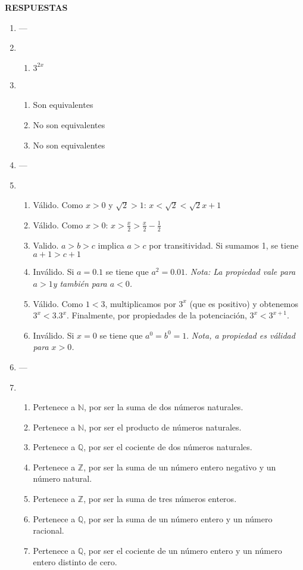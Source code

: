 \documentclass[a4paper]{article}
\newcommand{\exercise}{\item}
\begin{document}
\vspace{20pt} 
 \textbf{RESPUESTAS}\begin{enumerate}\exercise---\exercise\begin{enumerate} [label=(\alph*)]		\item $3^{2x}$
\end{enumerate}\exercise\begin{enumerate} [label=(\alph*)]		\item Son equivalentes
		\item No son equivalentes
		\item No son equivalentes
\end{enumerate}\exercise---\exercise\begin{enumerate} [label=(\alph*)]		\item Válido. Como $x>0$ y $\sqrt{2}>1$: $x < \sqrt{2} < \sqrt{2} x +1$
		\item Válido. Como $x>0$: $x > \displaystyle\frac{x}{2} > \displaystyle\frac{x}{2}-\displaystyle\frac{1}{2}$ 
		\item	Valido. $a>b>c$ implica $a>c$ por transitividad. Si sumamos 1, se tiene $a+1>c+1$
		\item Inválido. Si $a=0.1$ se tiene que $a^2=0.01$. \textit{Nota: La propiedad vale para $a>1$y también para $a<0$.}
		\item Válido. Como $1 < 3$, multiplicamos por $3^{x}$ (que es positivo) y obtenemos $3^{x} < 3.3^{x}$. Finalmente, por propiedades de la potenciación, $3^{x} < 3^{x+1}$.
		\item Inválido. Si $x=0$ se tiene que $a^0=b^0=1$. \textit{Nota, a propiedad es válidad para $x>0$.}
\end{enumerate}\exercise---\exercise\begin{enumerate} [label=(\alph*)]		\item Pertenece a $\mathbb{N}$, por ser la suma de dos números naturales.
		\item Pertenece a $\mathbb{N}$, por ser el producto de números naturales.
		\item Pertenece a $\mathbb{Q}$, por ser el cociente de dos números naturales. 
		\item Pertenece a $\mathbb{Z}$, por ser la suma de un número entero negativo y un número natural.
		\item Pertenece a $\mathbb{Z}$, por ser la suma de tres números enteros.
		\item Pertenece a $\mathbb{Q}$, por ser la suma de un número entero y un número racional.
		\item Pertenece a $\mathbb{Q}$, por ser el cociente de un número entero y un número entero distinto de cero.

\end{enumerate}
\end{enumerate}
\end{document}
